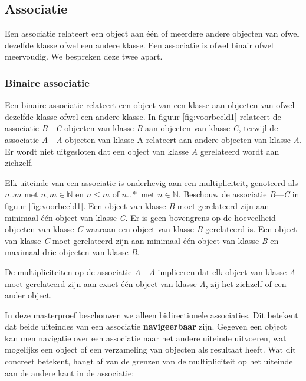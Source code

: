 \subsection{Associatie}

Een associatie relateert een object aan \'e\'en of meerdere andere objecten van ofwel dezelfde klasse ofwel een andere klasse. Een associatie is ofwel binair ofwel meervoudig. We bespreken deze twee apart.

\subsubsection{Binaire associatie}\label{sec:bin-assoc}

Een binaire associatie relateert een object van een klasse aan objecten van ofwel dezelfde klasse ofwel een andere klasse. In figuur \ref{fig:voorbeeld1} relateert de associatie \textit{B}---\textit{C} objecten van klasse \textit{B} aan objecten van klasse \textit{C}, terwijl de associatie \textit{A}---\textit{A} objecten van klasse A relateert aan andere objecten van klasse \textit{A}. Er wordt niet uitgesloten dat een object van klasse \textit{A} gerelateerd wordt aan zichzelf.

Elk uiteinde van een associatie is onderhevig aan een multipliciteit, genoteerd als $n..m$ met $n,m \in \mathbb{N}$ en $n \leq m$ of $n..*$ met $n \in \mathbb{N}$. Beschouw de associatie \textit{B}---\textit{C} in figuur \ref{fig:voorbeeld1}. Een object van klasse \textit{B} moet gerelateerd zijn aan minimaal \'e\'en object van klasse \textit{C}. Er is geen bovengrens op de hoeveelheid objecten van klasse \textit{C} waaraan een object van klasse \textit{B} gerelateerd is. Een object van klasse \textit{C} moet gerelateerd zijn aan minimaal \'e\'en object van klasse \textit{B} en maximaal drie objecten van klasse \textit{B}.

De multipliciteiten op de associatie \textit{A}---\textit{A} impliceren dat elk object van klasse \textit{A} moet gerelateerd zijn aan exact \'e\'en object van klasse \textit{A}, zij het zichzelf of een ander object.

In deze masterproef beschouwen we alleen bidirectionele associaties. Dit betekent dat beide uiteindes van een associatie \textbf{navigeerbaar} zijn. Gegeven een object kan men navigatie over een associatie naar het andere uiteinde uitvoeren, wat mogelijks een object of een verzameling van objecten als resultaat heeft. Wat dit concreet betekent, hangt af van de grenzen van de multipliciteit op het uiteinde aan de andere kant in de associatie:


